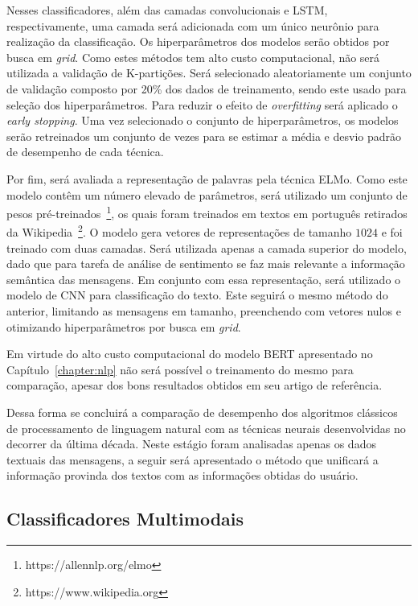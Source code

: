Nesses classificadores, além das camadas convolucionais e LSTM, respectivamente,
uma camada será adicionada com um único neurônio para realização da
classificação.
Os hiperparâmetros dos modelos serão obtidos por busca em \textit{grid}.
Como estes métodos tem alto custo computacional, não será utilizada a validação
de K-partições.
Será selecionado aleatoriamente um conjunto de validação composto por 20\% dos
dados de treinamento, sendo este usado para seleção dos hiperparâmetros.
Para reduzir o efeito de \textit{overfitting} será aplicado o \textit{early
stopping}.
Uma vez selecionado o conjunto de hiperparâmetros, os modelos serão retreinados
um conjunto de vezes para se estimar a média e desvio padrão de desempenho de cada
técnica.

Por fim, será avaliada a representação de palavras pela técnica ELMo.
Como este modelo contêm um número elevado de parâmetros, será utilizado um
conjunto de pesos pré-treinados~\footnote{https://allennlp.org/elmo}, os quais
foram treinados em textos em português retirados da
Wikipedia~\footnote{https://www.wikipedia.org}.
O modelo gera vetores de representações de tamanho $1024$ e foi treinado com
duas camadas.
Será utilizada apenas a camada superior do modelo, dado que para tarefa de
análise de sentimento se faz mais relevante a informação semântica das mensagens.
Em conjunto com essa representação, será utilizado o modelo de CNN para
classificação do texto.
Este seguirá o mesmo método do anterior, limitando as mensagens em tamanho,
preenchendo com vetores nulos e otimizando hiperparâmetros por busca em
\textit{grid}.

Em virtude do alto custo computacional do modelo BERT apresentado no
Capítulo~\ref{chapter:nlp} não será possível o treinamento do mesmo para
comparação, apesar dos bons resultados obtidos em seu artigo de referência.

Dessa forma se concluirá a comparação de desempenho dos algoritmos clássicos
de processamento de linguagem natural com as técnicas neurais desenvolvidas no
decorrer da última década.
Neste estágio foram analisadas apenas os dados textuais das mensagens, a seguir
será apresentado o método que unificará a informação provinda dos textos com as
informações obtidas do usuário.

\subsection{Classificadores Multimodais}


